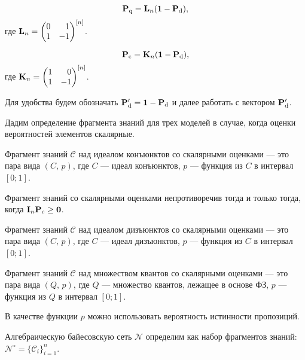 \begin{equation}\label{pdtopq}
\mathbf{P}_\mathrm{q} = \mathbf{L}_n(\mathbf{1} -\mathbf{P}_\mathrm{d}),
\end{equation} 
где $\Ln = \begin{pmatrix*}[r] 0 & 1 \\ 1 & -1 \end{pmatrix*}^{[n]}$.

\begin{equation}
\mathbf{P}_\mathrm{c} = \mathbf{K}_n(\mathbf{1} -\mathbf{P}_\mathrm{d}),
\end{equation}
где $\Kn = \begin{pmatrix*}[r] 1 & 0 \\ 1 & -1 \end{pmatrix*}^{[n]}$.

Для удобства будем обозначать $\mathbf{P}_\mathrm{d}^{\prime} = \mathbf{1} -\mathbf{P}_\mathrm{d}$ и далее работать с вектором $\mathbf{P}_\mathrm{d}^{\prime}$.

Дадим определение фрагмента знаний для трех моделей в случае, когда оценки вероятностей элементов скалярные.

\begin{definition}[\cite{1}]
Фрагмент знаний $\mathscr{C}$ над идеалом конъюнктов со скалярными оценками --- это пара вида $(C, \,p)$, где $C$ --- идеал конъюнктов, $p$ --- функция из $C$  в интервал $[0;1]$.
\end{definition}

\begin{definition}[\cite{1}]
	Фрагмент знаний со скалярными оценками непротиворечив тогда и только тогда, когда $\mathbf{I}_n\mathbf{P}_\mathrm{c} \geq \mathbf{0}$.
\end{definition}

\begin{definition}[\cite{121}]
Фрагмент знаний $\mathscr{C}$ над идеалом дизъюнктов со скалярными оценками --- это пара вида $(C, \,p)$, где $C$ --- идеал дизъюнктов, $p$ --- функция из $C$  в интервал $[0;1]$.
\end{definition}

\begin{definition}[\cite{121}]
Фрагмент знаний $\mathscr{C}$ над множеством квантов со скалярными оценками --- это пара вида $(Q, \,p)$, где $Q$ --- множество квантов, лежащее в основе ФЗ, $p$ --- функция из $Q$  в интервал $[0;1]$.
\end{definition}

В качестве функции $p$ можно использовать вероятность истинности пропозиций.
\begin{definition}[\cite{1}]
Алгебраическую байесовскую сеть $\mathcal{N}$ определим как набор фрагментов знаний: $\mathcal{N}^{\circ} = \{\mathscr{C}_i\}_{i=1}^{n}$.
\end{definition}